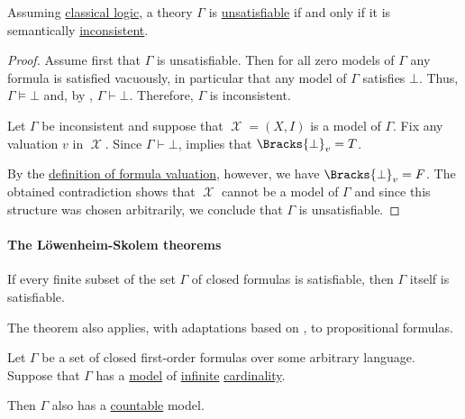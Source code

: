 \begin{proposition}\label{thm:formulas_unsatisfiable_iff_inconsistent}
   Assuming \hyperref[rem:classical_logic]{classical logic}, a theory \( \Gamma \) is \hyperref[def:propositional_model]{unsatisfiable} if and only if it is semantically \hyperref[def:first_order_theory/consistent]{inconsistent}.
\end{proposition}
\begin{proof}
  \SufficiencySubProof Assume first that \( \Gamma \) is unsatisfiable. Then for all zero models of \( \Gamma \) any formula is satisfied vacuously, in particular that any model of \( \Gamma \) satisfies \( \bot \). Thus, \( \Gamma \vDash \bot \) and, by , \( \Gamma \vdash \bot \). Therefore, \( \Gamma \) is inconsistent.

  \NecessitySubProof Let \( \Gamma \) be inconsistent and suppose that \( \mscrX = (X, I) \) is a model of \( \Gamma \). Fix any valuation \( v \) in \( \mscrX \). Since \( \Gamma \vdash \bot \),  implies that \( \Bracks{\bot}_v = T \).

  By the \hyperref[def:first_order_valuation/formula_valuation]{definition of formula valuation}, however, we have \( \Bracks{\bot}_v = F \). The obtained contradiction shows that \( \mscrX \) cannot be a model of \( \Gamma \) and since this structure was chosen arbitrarily, we conclude that \( \Gamma \) is unsatisfiable.
\end{proof}

\paragraph{The L\"owenheim-Skolem theorems}

\begin{theorem}\label{thm:first_order_compactness_theorem}
  If every finite subset of the set \( \Gamma \) of closed formulas is satisfiable, then \( \Gamma \) itself is satisfiable.
\end{theorem}
\begin{comments}
  \item The theorem also applies, with adaptations based on , to propositional formulas.
\end{comments}

\begin{theorem}\label{thm:downward_lowenheim_skolem_theorem}
  Let \( \Gamma \) be a set of closed first-order formulas over some arbitrary language. Suppose that \( \Gamma \) has a \hyperref[def:first_order_model]{model} of \hyperref[def:set_finiteness]{infinite} \hyperref[thm:cardinality_existence]{cardinality}.

  Then \( \Gamma \) also has a \hyperref[def:set_countability]{countable} model.
\end{theorem}

